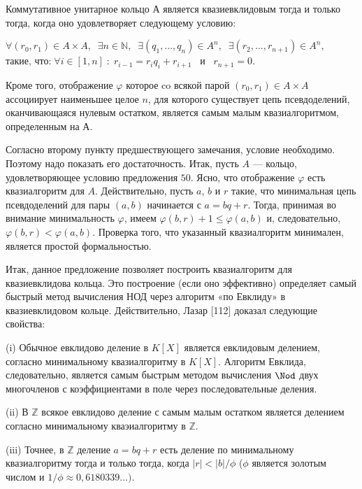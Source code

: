 \begin{predl}
\hspace*{0.5cm}
Коммутативное унитарное кольцо А является квазиевклидовым то­гда и только тогда, когда оно удовлетворяет следующему условию:

\begin{center}
$\forall(r_{0},r_{1})\in A\times A,\;\;\exists n\in\mathbb{N},\;\;\exists(q_{1},\ldots,q_{n})\in A^n,\;\;\exists(r_{2},\ldots,r_{n+1})\in A^n,$\linebreak
$\text{такие, что:}\;\forall i\in[1,n]\; : \; r_{i-1}=r_{i}q_{i}+r_{i+1}\;\;\;\text{и}\;\;\;r_{n+1} = 0$.
\end{center}
Кроме того, отображение $\varphi$ которое co всякой парой $(r_{0},r_{1})\in A\times A$ ассоциирует наименьшее целое $n$, для которого существует цепь псевдоделений, оканчивающаяся нулевым остатком, является самым малым
квазиалгоритмом, определенным на А.
\end{predl}
\begin{myproof}
Согласно второму пункту предшествующего замечания, условие необходимо. Поэтому надо показать его достаточность. Итак, пусть
$A$ — кольцо, удовлетворяющее условию предложения $50$. Ясно, что
отображение $\varphi$ есть квазиалгоритм для $A$. Действительно, пусть $a$,
$b$ и $r$ такие, что минимальная цепь псевдоделений для пары $(a,b)$
начинается с $a=bq+r$. Тогда, принимая во внимание минималь­ность $\varphi$, имеем $\varphi(b,r)+1\leqslant\varphi(a,b)$ и, следовательно, $\varphi(b,r) < \varphi(a,b)$.
Проверка того, что указанный квазиалгоритм минимален, является простой формальностью.
\end{myproof}

Итак, данное предложение позволяет построить квазиалгоритм для
квазиевклидова кольца. Это построение (если оно эффективно) опре­деляет самый быстрый метод вычисления НОД через алгоритм «по Евклиду» в квазиевклидовом кольце. Действительно, Лазар [112] доказал
следующие свойства:
\begin{thm}[Лазара]
\hspace*{0.5cm}
(i) Обычное евклидово деление в $K[X]$ является евклидовым делением, согласно минимальному квазиалгоритму в $K[X]$. Алгоритм Евклида, следовательно, является самым быстрым методом вычисления $\Nod$ двух многочленов с коэффициентами в поле через последовательные
деления.

(ii) В $\mathbb{Z}$ всякое евклидово деление с самым малым остатком является делением согласно минимальному кваэиалгоритму в $\mathbb{Z}$.

(iii) Точнее, в $\mathbb{Z}$ деление $a = bq+r$ есть деление по минимальному квазиалгоритму тогда и только тогда, когда $|r| < |b|/\phi$ ($\phi$ является золотым числом и $1/\phi\approx0,6180339\ldots)$.
\end{thm}

